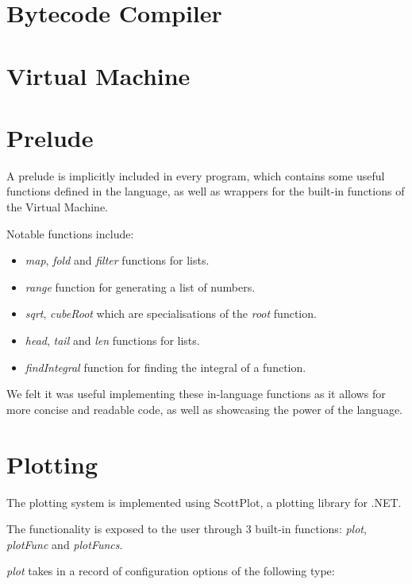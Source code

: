 \section{Bytecode Compiler}\label{sec:compiler}

\section{Virtual Machine}\label{sec:virtual-machine}

\section{Prelude}\label{sec:prelude}

A prelude is implicitly included in every program, which contains some useful functions defined in the language, as 
well as wrappers for the built-in functions of the Virtual Machine.

Notable functions include:

\begin{itemize}
    \item \textit{map}, \textit{fold} and \textit{filter} functions for lists.
    \item \textit{range} function for generating a list of numbers.
    \item \textit{sqrt}, \textit{cubeRoot} which are specialisations of the \textit{root} function.
    \item \textit{head}, \textit{tail} and \textit{len} functions for lists.
    \item \textit{findIntegral} function for finding the integral of a function.
\end{itemize}

We felt it was useful implementing these in-language functions as it allows for more concise and readable code, as
well as showcasing the power of the language.

\section{Plotting}\label{sec:plotting}

The plotting system is implemented using ScottPlot\citep{scottPlot}, a plotting library for .NET\@.

The functionality is exposed to the user through 3 built-in functions: \textit{plot}, \textit{plotFunc} and 
\textit{plotFuncs}.

\textit{plot} takes in a record of configuration options of the following type:

